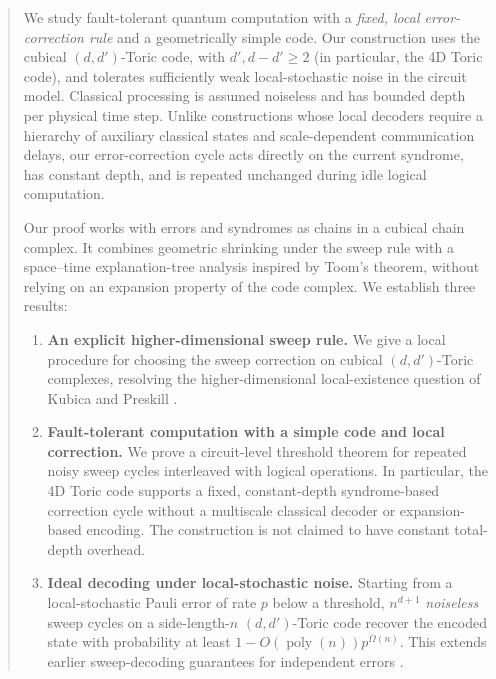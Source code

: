\begin{abstract}
We study fault-tolerant quantum computation with a \emph{fixed, local error-correction rule} and a geometrically simple code. Our construction uses the cubical $(d,d')$-Toric code, with $d',d-d'\geq 2$ (in particular, the 4D Toric code), and tolerates sufficiently weak local-stochastic  noise in the circuit model. Classical processing is assumed noiseless and has bounded depth per physical time step. Unlike constructions whose local decoders require a hierarchy of auxiliary classical states and scale-dependent communication delays, our error-correction cycle acts directly on the current syndrome, has constant depth, and is repeated unchanged during idle logical computation.

Our proof works with errors and syndromes as chains in a cubical chain complex. It combines geometric shrinking under the sweep rule with a space--time explanation-tree analysis inspired by Toom's theorem, without relying on an expansion property of the code complex. We establish three results:
\begin{enumerate}
    \item \textbf{An explicit higher-dimensional sweep rule.} We give a local procedure for choosing the sweep correction on cubical $(d,d')$-Toric complexes, resolving the higher-dimensional local-existence question of Kubica and Preskill \cite{Kubica_2019}.
    \item \textbf{Fault-tolerant computation with a simple code and local correction.} We prove a circuit-level threshold theorem for repeated noisy sweep cycles interleaved with logical operations. In particular, the 4D Toric code supports a fixed, constant-depth syndrome-based correction cycle without a multiscale classical decoder or expansion-based encoding. The construction is not claimed to have constant total-depth overhead.
    \item \textbf{Ideal decoding under local-stochastic noise.} Starting from a local-stochastic Pauli error of rate $p$ below a threshold, $n^{d+1}$ \emph{noiseless} sweep cycles on a side-length-$n$ $(d,d')$-Toric code recover the encoded state with probability at least $1-O(\operatorname{poly}(n))p^{\Omega(n)}$. This extends earlier sweep-decoding guarantees for independent errors \cite{Kubica_2019}.
\end{enumerate}
\end{abstract}
